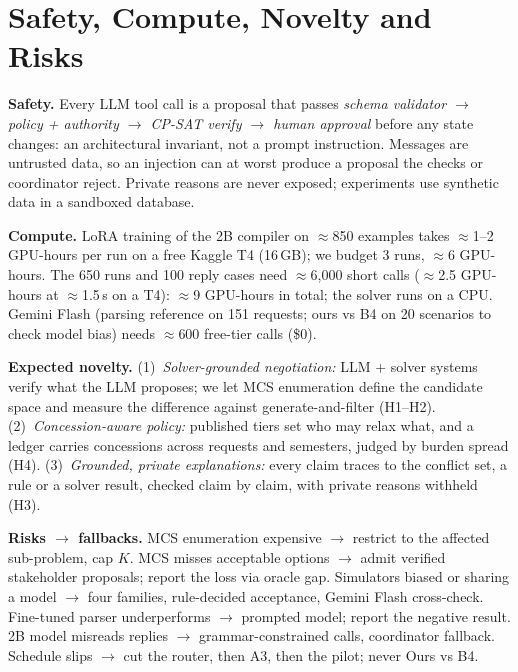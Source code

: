 \documentclass[11pt,a4paper]{article}
\begin{document}
\section{Safety, Compute, Novelty and Risks}
\small
\begin{tcolorbox}[enhanced,colback=lightblue,colframe=boxblue,boxrule=0.8pt,
  arc=3pt,left=6pt,right=6pt,top=2pt,bottom=2pt]
\small
\textbf{Safety.} Every LLM tool call is a proposal that passes \emph{schema validator $\to$
policy + authority $\to$ CP-SAT verify $\to$ human approval} before any
state changes: an architectural invariant, not a prompt
instruction. Messages are untrusted data, so an injection can at worst
produce a proposal the checks or coordinator reject. Private reasons are
never exposed; experiments use synthetic data in a sandboxed database.
\end{tcolorbox}
\medskip\noindent\textbf{Compute.} LoRA training of the 2B compiler on $\approx$850 examples takes
$\approx$1--2 GPU-hours per run on a free Kaggle T4 (16\,GB); we budget 3
runs, $\approx$6 GPU-hours. The 650 runs and 100 reply cases need
$\approx$6{,}000 short calls ($\approx$2.5 GPU-hours at $\approx$1.5\,s on a
T4): $\approx$9 GPU-hours in total; the solver runs on a CPU.
Gemini Flash (parsing reference on 151 requests; ours vs B4
on 20 scenarios to check model bias) needs $\approx$600 free-tier calls (\$0).

\medskip\noindent\textbf{Expected novelty.} (1)~\emph{Solver-grounded negotiation:}
LLM + solver systems verify what the LLM proposes; we let MCS enumeration
define the candidate space and measure the difference against
generate-and-filter (H1--H2). (2)~\emph{Concession-aware policy:} published
tiers set who may relax what, and a ledger carries concessions across
requests and semesters, judged by burden spread (H4). (3)~\emph{Grounded,
private explanations:} every claim traces to the conflict set, a rule or a
solver result, checked claim by claim, with private reasons withheld (H3).

\medskip\noindent\textbf{Risks $\to$ fallbacks.} MCS enumeration expensive $\to$
restrict to the affected sub-problem, cap $K$. MCS misses acceptable options
$\to$ admit verified stakeholder proposals; report the loss via oracle gap.
Simulators biased or sharing a model $\to$ four families, rule-decided
acceptance, Gemini Flash cross-check. Fine-tuned parser underperforms $\to$
prompted model; report the negative result. 2B model misreads replies
$\to$ grammar-constrained calls, coordinator fallback. Schedule slips $\to$ cut the
router, then A3, then the pilot; never Ours vs B4.
\end{document}
